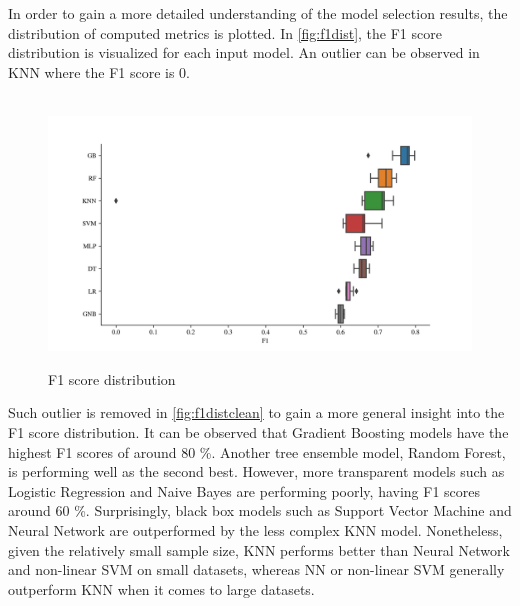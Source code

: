 \clearpage
\newpage
{}
\restoregeometry
\fancyheadoffset{0pt}

In order to gain a more detailed understanding of the model selection results, the distribution of computed metrics is plotted. In \autoref{fig:f1dist}, the F1 score distribution is visualized for each input model. An outlier can be observed in KNN where the F1 score is 0.				
\begin{figure}[H]
    \centering
    \caption{F1 score distribution}\vspace{0.5em}
    \label{fig:f1dist}\
    \includegraphics[width=140mm]{Figures/F1_Distribution.jpg}
    \vspace{-1em}
\end{figure}
Such outlier is removed in \autoref{fig:f1distclean} to gain a more general insight into the F1 score distribution.
It can be observed that Gradient Boosting models have the highest F1 scores of around 80 \%.
Another tree ensemble model, Random Forest, is performing well as the second best. However, more transparent models such as Logistic Regression and Naive Bayes are performing poorly, having F1 scores around 60 \%.
Surprisingly, black box models such as Support Vector Machine and Neural Network are outperformed by the less complex KNN model.
Nonetheless, given the relatively small sample size, KNN performs better than Neural Network and non-linear SVM on small datasets, whereas NN or non-linear SVM generally outperform KNN when it comes to large datasets.
